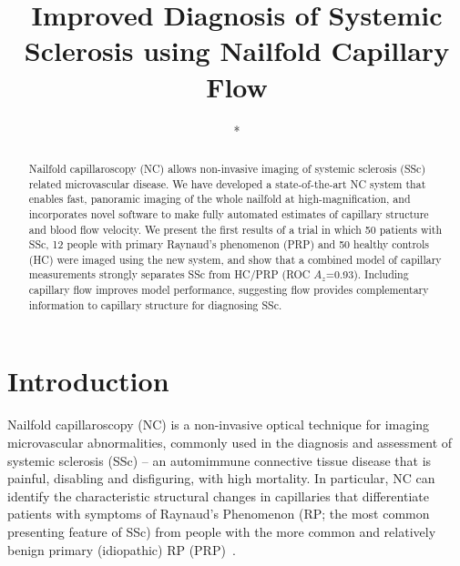 \documentclass[runningheads,a4paper]{llncs}
\begin{document}
\mainmatter  %

\title{Improved Diagnosis of Systemic Sclerosis using Nailfold Capillary Flow}


%
%
\author{*}%

\institute{*}
\authorrunning{*} %

\tocauthor{}
\maketitle


\begin{abstract}
Nailfold capillaroscopy (NC) allows non-invasive imaging of systemic sclerosis (SSc) related microvascular disease. We have developed a state-of-the-art NC system that enables fast, panoramic imaging of the whole nailfold at high-magnification, and incorporates novel software to make fully automated estimates of capillary structure and blood flow velocity. We present the first results of a trial in which 50 patients with SSc, 12 people with primary Raynaud’s phenomenon (PRP) and 50 healthy controls (HC) were imaged using the new system, and show that a combined model of capillary measurements strongly separates SSc from HC/PRP (ROC $A_z$=0.93). Including capillary flow improves model performance, suggesting flow provides complementary information to capillary structure for diagnosing SSc.
\end{abstract}

\section{Introduction}
\label{s:introduction}
Nailfold capillaroscopy (NC) is a non-invasive optical technique for imaging microvascular abnormalities, commonly used in the diagnosis and assessment of systemic sclerosis (SSc) -- an automimmune connective tissue disease that is painful, disabling and disfiguring, with high mortality. In particular, NC can identify the characteristic structural changes in capillaries that differentiate patients with symptoms of Raynaud’s Phenomenon (RP; the most common presenting feature of SSc) from people with the more common and relatively benign primary (idiopathic) RP (PRP)~\cite{HerrickCOinR2011,Cutolo_etal_BPRCR08}.
\end{document}
